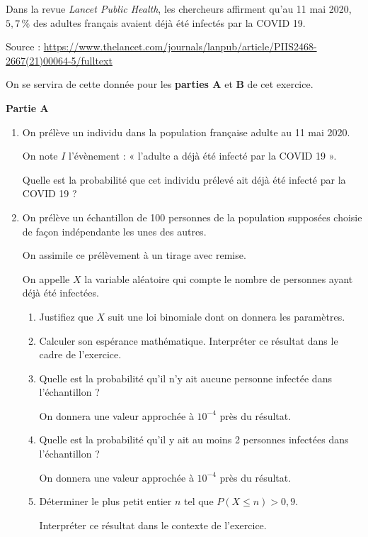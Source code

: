 Dans la revue \textit{Lancet Public Health}, les chercheurs affirment qu’au 11 mai 2020, $5,7$\,\% des adultes français avaient déjà été infectés par la COVID 19.

{\footnotesize Source : \url{https://www.thelancet.com/journals/lanpub/article/PIIS2468-2667(21)00064-5/fulltext}}

On se servira de cette donnée pour les \textbf{parties A} et \textbf{B} de cet exercice.

\medskip

\textbf{Partie A}

\smallskip

\begin{enumerate}
	\item On prélève un individu dans la population française adulte au 11 mai 2020.
	
	\smallskip
	
	On note $I$ l’évènement : « l’adulte a déjà été infecté par la COVID 19 ».
	
	\smallskip
	
	Quelle est la probabilité que cet individu prélevé ait déjà été infecté par la COVID
	19 ?
	\item On prélève un échantillon de 100 personnes de la population supposées choisie de façon indépendante les unes des autres.
	
	On assimile ce prélèvement à un tirage avec remise.
	
	On appelle $X$ la variable aléatoire qui compte le nombre de personnes ayant déjà été infectées.
	\begin{enumerate}
		\item Justifiez que $X$ suit une loi binomiale dont on donnera les paramètres.
		\item Calculer son espérance mathématique. Interpréter ce résultat dans le cadre de l’exercice.
		\item Quelle est la probabilité qu’il n’y ait aucune personne infectée dans l’échantillon ?
		
		On donnera une valeur approchée à $10^{-4}$ près du résultat.
		\item Quelle est la probabilité qu’il y ait au moins 2 personnes infectées dans l’échantillon ?
		
		On donnera une valeur approchée à $10^{-4}$ près du résultat.
		\item Déterminer le plus petit entier $n$ tel que $P(X \leqslant n) > 0,9$.
		
		Interpréter ce résultat dans le contexte de l’exercice.
	\end{enumerate}
\end{enumerate}

